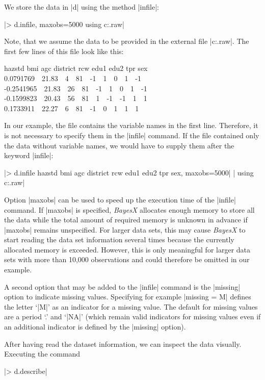We store the data in |d| using the method |infile|:

|> d.infile, maxobs=5000 using c:\data\zambia.raw|

Note, that we assume the data to be provided in the external file |c:\data\zambia.raw|. The first few lines of this file look
like this:

{\footnotesize
 hazstd bmi agc district rcw edu1 edu2 tpr sex\\
 0.0791769 \,\, 21.83 \,\, 4 \,\, 81 \,\, -1 \,\, 1 \,\, 0 \,\, 1 \,\, -1\\
 -0.2541965 \,\, 21.83 \,\, 26 \,\, 81 \,\, -1 \,\, 1 \,\, 0 \,\, 1 \,\, -1\\
 -0.1599823 \,\, 20.43 \,\, 56 \,\, 81 \,\, 1 \,\, -1 \,\, -1 \,\, 1 \,\, 1\\
 0.1733911 \,\, 22.27 \,\, 6 \,\, 81 \,\, -1 \,\, 0 \,\, 1 \,\, 1 \,\, 1}

In our example, the file contains the variable names in the first line. Therefore, it is not necessary to specify them in the
|infile| command. If the file contained only the data without variable names, we would have to supply them after the keyword
|infile|:

 |> d.infile hazstd bmi agc district rcw edu1 edu2 tpr sex, maxobs=5000|
 |  using c:\data\zambia.raw|

Option |maxobs| can be used to speed up the execution time of the |infile| command. If |maxobs| is specified, {\it BayesX}
allocates enough memory to store all the data while the total amount of required memory is unknown in advance if |maxobs|
remains unspecified. For larger data sets, this may cause {\it BayesX} to start reading the data set information several times
because the currently allocated memory is exceeded. However, this is only meaningful for larger data sets with more than 10,000
observations and could therefore be omitted in our example.

A second option that may be added to the |infile| command is the |missing| option to indicate missing values. Specifying for
example |missing = M| defines the letter `|M|' as an indicator for a missing value. The default for missing values are a period
`.' and `|NA|' (which remain valid indicators for missing values even if an additional indicator is defined by the |missing|
option).

After having read the dataset information, we can inspect the data visually. Executing the command

|> d.describe|

